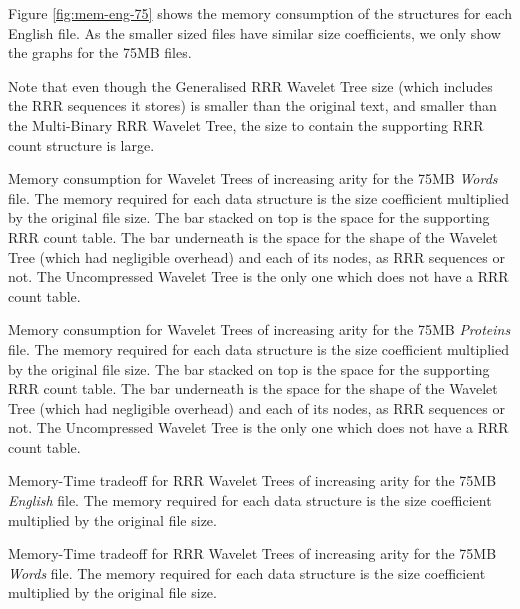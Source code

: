 Figure \ref{fig:mem-eng-75} shows the memory consumption of the structures for 
each English file. As the smaller sized files have similar size coefficients, we
only show the graphs for the 75MB files.

Note that even though the Generalised RRR Wavelet Tree size (which 
includes the RRR sequences it stores) is smaller than the original text, and 
smaller than the Multi-Binary RRR Wavelet Tree, the size to contain the 
supporting RRR count structure is large.

			{Memory consumption for Wavelet Trees of increasing arity for
			the 75MB \emph{Words} file. The memory required for each data 
			structure is the size coefficient 
			multiplied by the original file size.
			The bar stacked on top is the space for
			the supporting RRR count table. The bar underneath is the space for
			the shape of the Wavelet Tree (which had negligible overhead) and 
			each of its
			nodes, as RRR sequences or not. The Uncompressed Wavelet Tree is
			the only one which does not have a RRR count table.}

			{Memory consumption for Wavelet Trees of increasing arity for
			the 75MB \emph{Proteins} file. The memory required for each data 
			structure is the size coefficient 
			multiplied by the original file size.
			The bar stacked on top is the space for
			the supporting RRR count table. The bar underneath is the space for
			the shape of the Wavelet Tree (which had negligible overhead) and 
			each of its
			nodes, as RRR sequences or not. The Uncompressed Wavelet Tree is
			the only one which does not have a RRR count table.}
		
			{Memory-Time tradeoff for RRR Wavelet Trees of increasing arity for
			the 75MB \emph{English} file. The memory required for each data 
			structure is the size coefficient 
			multiplied by the original file size.}
		
			{Memory-Time tradeoff for RRR Wavelet Trees of increasing arity for
			the 75MB \emph{Words} file. The memory required for each data 
			structure is the size coefficient 
			multiplied by the original file size.}
		
